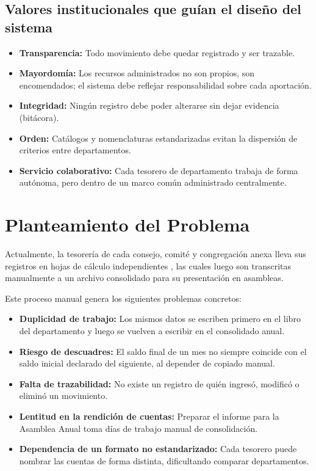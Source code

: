 \documentclass[11pt,a4paper]{article}
\begin{document}
	\subsection{Valores institucionales que guían el diseño del sistema}
	\begin{itemize}
		\item \textbf{Transparencia:} Todo movimiento debe quedar registrado y ser trazable.
		\item \textbf{Mayordomía:} Los recursos administrados no son propios, son encomendados; el sistema debe reflejar responsabilidad sobre cada aportación.
		\item \textbf{Integridad:} Ningún registro debe poder alterarse sin dejar evidencia (bitácora).
		\item \textbf{Orden:} Catálogos y nomenclaturas estandarizadas evitan la dispersión de criterios entre departamentos.
		\item \textbf{Servicio colaborativo:} Cada tesorero de departamento trabaja de forma autónoma, pero dentro de un marco común administrado centralmente.
	\end{itemize}

	\newpage
	\section{Planteamiento del Problema}
	Actualmente, la tesorería de cada consejo, comité y congregación anexa lleva sus registros en hojas de cálculo independientes , las cuales luego son transcritas manualmente a un archivo consolidado  para su presentación en asambleas.
	
	Este proceso manual genera los siguientes problemas concretos:
	\begin{itemize}
		\item \textbf{Duplicidad de trabajo:} Los mismos datos se escriben primero en el libro del departamento y luego se vuelven a escribir en el consolidado anual.
		\item \textbf{Riesgo de descuadres:} El saldo final de un mes no siempre coincide con el saldo inicial declarado del siguiente, al depender de copiado manual.
		\item \textbf{Falta de trazabilidad:} No existe un registro de quién ingresó, modificó o eliminó un movimiento.
		\item \textbf{Lentitud en la rendición de cuentas:} Preparar el informe para la Asamblea Anual toma días de trabajo manual de consolidación.
		\item \textbf{Dependencia de un formato no estandarizado:} Cada tesorero puede nombrar las cuentas de forma distinta, dificultando comparar departamentos.
	\end{itemize}
	
\end{document}
